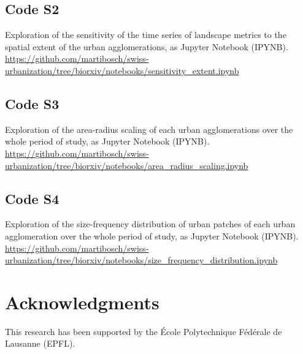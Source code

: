 \subsection*{Code S2}
\label{code-sensitivity-extent}
Exploration of the sensitivity of the time series of landscape metrics to the spatial extent of the urban agglomerations, as Jupyter Notebook (IPYNB).
\url{https://github.com/martibosch/swiss-urbanization/tree/biorxiv/notebooks/sensitivity_extent.ipynb}

\subsection*{Code S3}
\label{code-area-radius-scaling}
Exploration of the area-radius scaling of each urban agglomerations over the whole period of study, as Jupyter Notebook (IPYNB).
\url{https://github.com/martibosch/swiss-urbanization/tree/biorxiv/notebooks/area_radius_scaling.ipynb}

\subsection*{Code S4}
\label{code-size-frequency-distribution}
Exploration of the size-frequency distribution of urban patches of each urban agglomeration over the whole period of study, as Jupyter Notebook (IPYNB).
\url{https://github.com/martibosch/swiss-urbanization/tree/biorxiv/notebooks/size_frequency_distribution.ipynb}


\section*{Acknowledgments}
This research has been supported by the \'Ecole Polytechnique F\'ed\'erale de Lausanne (EPFL).




